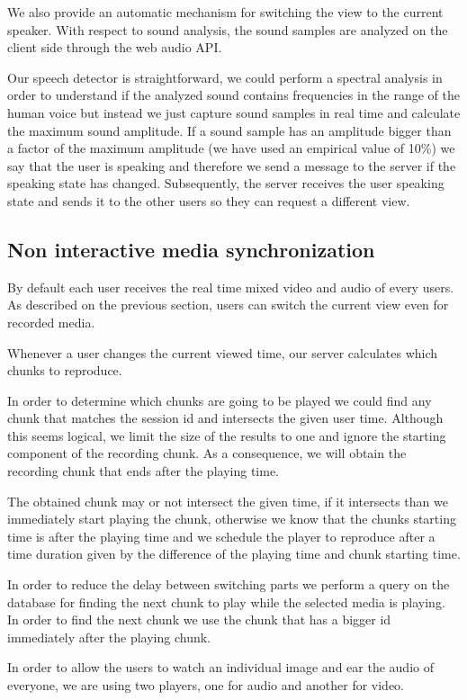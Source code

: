 		We also provide an automatic mechanism for switching the view to the current speaker. With respect to sound analysis, the sound samples are analyzed on the client side through the web audio \ac{API}.

		Our speech detector is straightforward, we could perform a spectral analysis in order to understand if the analyzed sound contains frequencies in the range of the human voice but instead we just capture sound samples in real time and calculate the maximum sound amplitude. If a sound sample has an amplitude bigger than a factor of the maximum amplitude (we have used an empirical value of 10\%) we say that the user is speaking and therefore we send a message to the server if the speaking state has changed. Subsequently, the server receives the user speaking state and sends it to the other users so they can request a different view.


\subsection{Non interactive media synchronization}
		By default each user receives the real time mixed video and audio of every users. As described on the previous section, users can switch the current view even for recorded media.

		Whenever a user changes the current viewed time, our server calculates which chunks to reproduce.

		In order to determine which chunks are going to be played we could find any chunk that matches the session id and intersects the given user time. Although this seems logical, we limit the size of the results to one and ignore the starting component of the recording chunk. As a consequence, we will obtain the recording chunk that ends after the playing time.

		The obtained chunk may or not intersect the given time, if it intersects than we immediately start playing the chunk, otherwise we know that the chunks starting time is after the playing time and we schedule the player to reproduce after a time duration given by the difference of the playing time and chunk starting time.

		In order to reduce the delay between switching parts we perform a query on the database for finding the next chunk to play while the selected media is playing. In order to find the next chunk we use the chunk that has a bigger id immediately after the playing chunk.

		In order to allow the users to watch an individual image and ear the audio of everyone, we are using two players, one for audio and another for video. 

